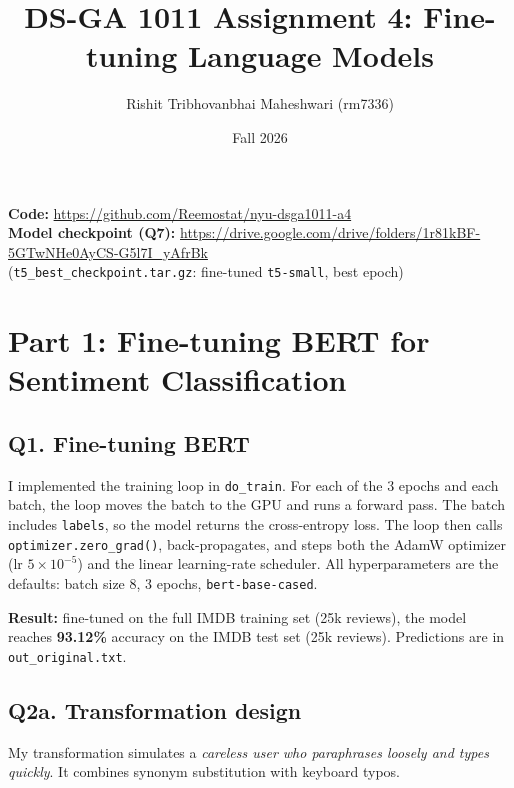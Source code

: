 \documentclass[11pt]{article}
\title{DS-GA 1011 Assignment 4: Fine-tuning Language Models}
\author{Rishit Tribhovanbhai Maheshwari (rm7336)}
\date{Fall 2026}
\begin{document}
\maketitle

\noindent\textbf{Code:} \url{https://github.com/Reemostat/nyu-dsga1011-a4}\\
\textbf{Model checkpoint (Q7):} \url{https://drive.google.com/drive/folders/1r81kBF-5GTwNHe0AyCS-G5l7I_yAfrBk}\\
(\texttt{t5\_best\_checkpoint.tar.gz}: fine-tuned \texttt{t5-small}, best epoch)

\section*{Part 1: Fine-tuning BERT for Sentiment Classification}

\subsection*{Q1. Fine-tuning BERT}
I implemented the training loop in \texttt{do\_train}. For each of the 3 epochs and each batch, the loop
moves the batch to the GPU and runs a forward pass. The batch includes \texttt{labels}, so the model returns the cross-entropy loss.
The loop then calls \texttt{optimizer.zero\_grad()}, back-propagates, and steps both the AdamW optimizer (lr $5\times10^{-5}$) and the linear
learning-rate scheduler. All hyperparameters are the defaults: batch size 8, 3 epochs, \texttt{bert-base-cased}.

\textbf{Result:} fine-tuned on the full IMDB training set (25k reviews), the model reaches
\textbf{93.12\%} accuracy on the IMDB test set (25k reviews). Predictions are in \texttt{out\_original.txt}.

\subsection*{Q2a. Transformation design}
My transformation simulates a \emph{careless user who paraphrases loosely and types quickly}. It combines
synonym substitution with keyboard typos.
\end{document}
